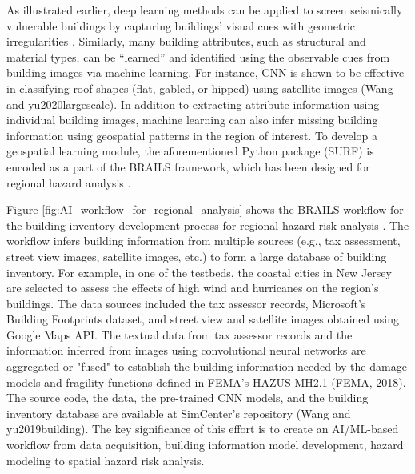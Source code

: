 As illustrated earlier, deep learning methods can be applied to screen seismically vulnerable buildings by capturing buildings' visual cues with geometric irregularities \citep{yu2020largescale}. Similarly, many building attributes, such as structural and material types, can be ``learned'' and identified using the observable cues from building images via machine learning. For instance, CNN is shown to be effective in classifying roof shapes (flat, gabled, or hipped) using satellite images (Wang and yu2020largescale). In addition to extracting attribute information using individual building images, machine learning can also infer missing building information using geospatial patterns in the region of interest. To develop a geospatial learning module, the aforementioned Python package (SURF) is encoded as a part of the BRAILS framework, which has been designed for regional hazard analysis \citep{wang2019surf}. 

Figure \ref{fig:AI_workflow_for_regional_analysis} shows the BRAILS workflow for the building inventory development process for regional hazard risk analysis \citep{wang2020flood}. The workflow infers building information from multiple sources (e.g., tax assessment, street view images, satellite images, etc.) to form a large database of building inventory. For example, in one of the testbeds, the coastal cities in New Jersey are selected to assess the effects of high wind and hurricanes on the region's buildings. The data sources included the tax assessor records, Microsoft's Building Footprints dataset, and street view and satellite images obtained using Google Maps API. The textual data from tax assessor records and the information inferred from images using convolutional neural networks are aggregated or "fused" to establish the building information needed by the damage models and fragility functions defined in FEMA's HAZUS MH2.1 (FEMA, 2018). The source code, the data, the pre-trained CNN models, and the building inventory database are available at SimCenter's repository (Wang and yu2019building). The key significance of this effort is to create an AI/ML-based workflow from data acquisition, building information model development, hazard modeling to spatial hazard risk analysis. 

